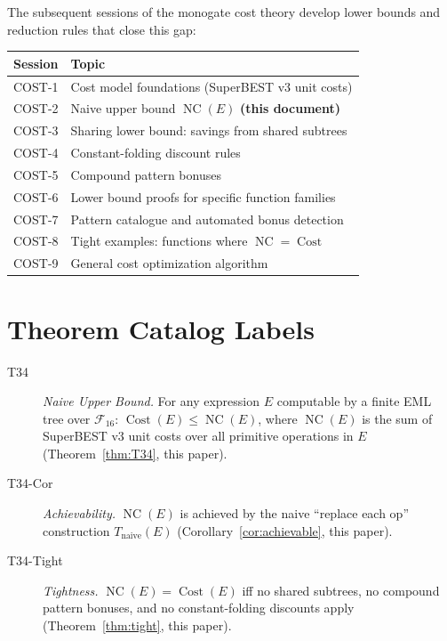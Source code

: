 \documentclass[12pt,a4paper]{article}
\theoremstyle{definition}
\newcommand{\NC}{\operatorname{NC}}
\newcommand{\Cost}{\operatorname{Cost}}
\begin{document}
The subsequent sessions of the monogate cost theory develop lower bounds
and reduction rules that close this gap:

\begin{center}
\begin{tabular}{@{}ll@{}}
\toprule
\textbf{Session} & \textbf{Topic} \\
\midrule
COST-1 & Cost model foundations (SuperBEST v3 unit costs) \\
COST-2 & Naive upper bound $\NC(E)$ \textbf{(this document)} \\
COST-3 & Sharing lower bound: savings from shared subtrees \\
COST-4 & Constant-folding discount rules \\
COST-5 & Compound pattern bonuses \\
COST-6 & Lower bound proofs for specific function families \\
COST-7 & Pattern catalogue and automated bonus detection \\
COST-8 & Tight examples: functions where $\NC = \Cost$ \\
COST-9 & General cost optimization algorithm \\
\bottomrule
\end{tabular}
\end{center}

\section*{Theorem Catalog Labels}

\begin{description}
  \item[T34] \emph{Naive Upper Bound.}
        For any expression $E$ computable by a finite EML tree over
        $\mathcal{F}_{16}$: $\Cost(E) \leq \NC(E)$, where $\NC(E)$ is the
        sum of SuperBEST v3 unit costs over all primitive operations in $E$
        (Theorem~\ref{thm:T34}, this paper).

  \item[T34-Cor] \emph{Achievability.}
        $\NC(E)$ is achieved by the naive ``replace each op'' construction
        $T_{\mathrm{naive}}(E)$
        (Corollary~\ref{cor:achievable}, this paper).

  \item[T34-Tight] \emph{Tightness.}
        $\NC(E) = \Cost(E)$ iff no shared subtrees, no compound pattern
        bonuses, and no constant-folding discounts apply
        (Theorem~\ref{thm:tight}, this paper).
\end{description}
\end{document}

